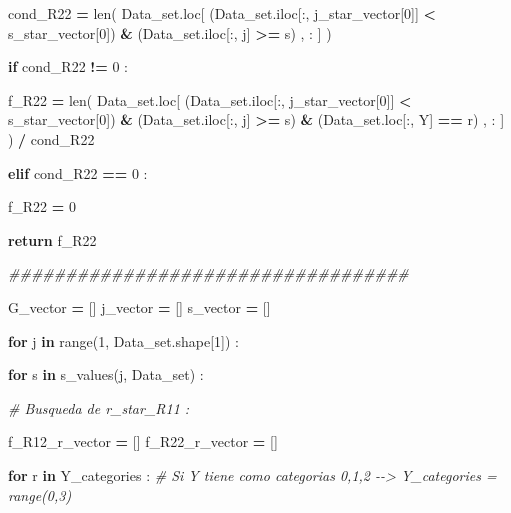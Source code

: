 \documentclass[
  11pt,
  a4paper,
]{article}
\newenvironment{Shaded}{\begin{snugshade}}{\end{snugshade}}
\newcommand{\BuiltInTok}[1]{#1}
\newcommand{\CommentTok}[1]{\textcolor[rgb]{0.56,0.35,0.01}{\textit{#1}}}
\newcommand{\ControlFlowTok}[1]{\textcolor[rgb]{0.13,0.29,0.53}{\textbf{#1}}}
\newcommand{\DecValTok}[1]{\textcolor[rgb]{0.00,0.00,0.81}{#1}}
\newcommand{\KeywordTok}[1]{\textcolor[rgb]{0.13,0.29,0.53}{\textbf{#1}}}
\newcommand{\NormalTok}[1]{#1}
\newcommand{\OperatorTok}[1]{\textcolor[rgb]{0.81,0.36,0.00}{\textbf{#1}}}
\newcommand{\StringTok}[1]{\textcolor[rgb]{0.31,0.60,0.02}{#1}}
\begin{document}
\begin{Shaded}
\begin{Highlighting}[]
\NormalTok{            cond\_R22 }\OperatorTok{=} \BuiltInTok{len}\NormalTok{( Data\_set.loc[ (Data\_set.iloc[:, j\_star\_vector[}\DecValTok{0}\NormalTok{]] }\OperatorTok{\textless{}}\NormalTok{ s\_star\_vector[}\DecValTok{0}\NormalTok{]) }\OperatorTok{\&}\NormalTok{ (Data\_set.iloc[:, j] }\OperatorTok{\textgreater{}=}\NormalTok{ s) , : ] ) }

            \ControlFlowTok{if}\NormalTok{  cond\_R22 }\OperatorTok{!=} \DecValTok{0}\NormalTok{ :}

\NormalTok{                f\_R22 }\OperatorTok{=} \BuiltInTok{len}\NormalTok{( Data\_set.loc[ (Data\_set.iloc[:, j\_star\_vector[}\DecValTok{0}\NormalTok{]] }\OperatorTok{\textless{}}\NormalTok{ s\_star\_vector[}\DecValTok{0}\NormalTok{]) }\OperatorTok{\&}\NormalTok{ (Data\_set.iloc[:, j] }\OperatorTok{\textgreater{}=}\NormalTok{ s) }\OperatorTok{\&}\NormalTok{ (Data\_set.loc[:, }\StringTok{\textquotesingle{}Y\textquotesingle{}}\NormalTok{] }\OperatorTok{==}\NormalTok{ r) , : ] ) }\OperatorTok{/}\NormalTok{ cond\_R22}

            
            \ControlFlowTok{elif}\NormalTok{ cond\_R22 }\OperatorTok{==} \DecValTok{0}\NormalTok{ :}

\NormalTok{                f\_R22 }\OperatorTok{=} \DecValTok{0}

            
            \ControlFlowTok{return}\NormalTok{ f\_R22 }


        \CommentTok{\#\#\#\#\#\#\#\#\#\#\#\#\#\#\#\#\#\#\#\#\#\#\#\#\#\#\#\#\#\#\#\#\#\#\#}

\NormalTok{        G\_vector }\OperatorTok{=}\NormalTok{ []}
\NormalTok{        j\_vector }\OperatorTok{=}\NormalTok{ []}
\NormalTok{        s\_vector }\OperatorTok{=}\NormalTok{ []}


        \ControlFlowTok{for}\NormalTok{ j }\KeywordTok{in} \BuiltInTok{range}\NormalTok{(}\DecValTok{1}\NormalTok{, Data\_set.shape[}\DecValTok{1}\NormalTok{]) :}

            \ControlFlowTok{for}\NormalTok{ s }\KeywordTok{in}\NormalTok{ s\_values(j, Data\_set) :}

                \CommentTok{\# Busqueda de r\_star\_R11 :}

\NormalTok{                f\_R12\_r\_vector }\OperatorTok{=}\NormalTok{ []}
\NormalTok{                f\_R22\_r\_vector }\OperatorTok{=}\NormalTok{ []}

                \ControlFlowTok{for}\NormalTok{ r }\KeywordTok{in}\NormalTok{ Y\_categories :  }\CommentTok{\# Si Y tiene como categorias 0,1,2 {-}{-}\textgreater{} Y\_categories = range(0,3)}


\end{Highlighting}
\end{Shaded}
\end{document}
